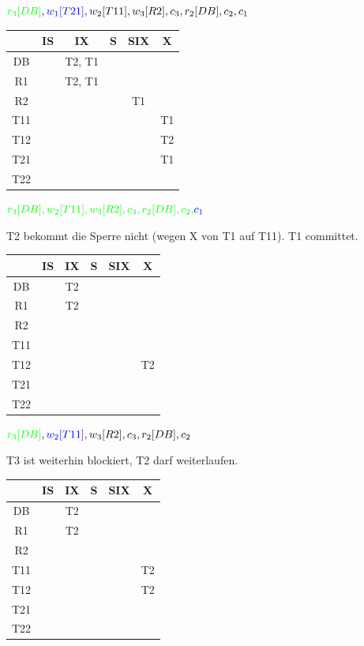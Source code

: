 \begin{note}
\begin{enumerate}[a)]
$\textcolor{green}{r_3[DB]}, \textcolor{blue}{w_1[T21]}, w_2[T11], w_3[R2], c_3, r_2[DB], c_2, c_1$

\begin{tabular}{|c|c|c|c|c|c|}
	\hline
	& IS & IX & S & SIX & X \\
	\hline
	DB & & T2, T1 &  &  &  \\
	\hline
	R1 &  & T2, T1 &  &  &  \\
	\hline
	R2 &  &  &  & T1 &  \\
	\hline
	T11 &  &  &  &  & T1 \\
	\hline
	T12 &  &  &  &  & T2 \\
	\hline
	T21 &  &  &  &  & T1 \\
	\hline
	T22 &  &  &  &  &  \\
	\hline
\end{tabular}

$\textcolor{green}{r_3[DB], w_2[T11], w_3[R2], c_3, r_2[DB], c_2,}\textcolor{blue}{c_1}$

T2 bekommt die Sperre nicht (wegen X von T1 auf T11). T1 committet.

\begin{tabular}{|c|c|c|c|c|c|}
	\hline
	& IS & IX & S & SIX & X \\
	\hline
	DB & & T2&  &  &  \\
	\hline
	R1 &  & T2 &  &  &  \\
	\hline
	R2 &  &  &  &  &  \\
	\hline
	T11 &  &  &  &  &  \\
	\hline
	T12 &  &  &  &  & T2 \\
	\hline
	T21 &  &  &  &  &  \\
	\hline
	T22 &  &  &  &  &  \\
	\hline
\end{tabular}

$\textcolor{green}{r_3[DB]}, \textcolor{blue}{w_2[T11]}, w_3[R2], c_3, r_2[DB], c_2$

T3 ist weiterhin blockiert, T2 darf weiterlaufen.

\begin{tabular}{|c|c|c|c|c|c|}
	\hline
	& IS & IX & S & SIX & X \\
	\hline
	DB & & T2&  &  &  \\
	\hline
	R1 &  & T2 &  &  &  \\
	\hline
	R2 &  &  &  &  &  \\
	\hline
	T11 &  &  &  &  & T2 \\
	\hline
	T12 &  &  &  &  & T2 \\
	\hline
	T21 &  &  &  &  &  \\
	\hline
	T22 &  &  &  &  &  \\
	\hline
\end{tabular}


\end{enumerate}
\end{note}
